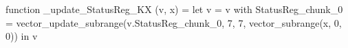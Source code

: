 function _update_StatusReg_KX (v, x) = let v = { v with StatusReg_chunk_0 = vector_update_subrange(v.StatusReg_chunk_0, 7, 7, vector_subrange(x, 0, 0)) } in v
